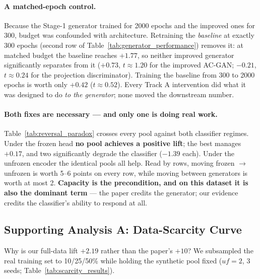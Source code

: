 \documentclass[11pt]{article}
\begin{document}
\paragraph{A matched-epoch control.} Because the Stage-1 generator trained for 2000 epochs and the improved ones for 300, budget was confounded with architecture. Retraining the \emph{baseline} at exactly 300 epochs (second row of Table~\ref{tab:generator_performance}) removes it: at matched budget the baseline reaches $+1.77$, so neither improved generator significantly separates from it ($+0.73$, $t \approx 1.20$ for the improved AC-GAN; $-0.21$, $t \approx 0.24$ for the projection discriminator). Training the baseline from 300 to 2000 epochs is worth only $+0.42$ ($t \approx 0.52$). Every Track A intervention did what it was designed to do \emph{to the generator}; none moved the downstream number.

\paragraph{Both fixes are necessary --- and only one is doing real work.} Table~\ref{tab:reversal_paradox} crosses every pool against both classifier regimes. Under the frozen head \textbf{no pool achieves a positive lift}; the best manages $+0.17$, and two significantly degrade the classifier ($-1.39$ each). Under the unfrozen encoder the identical pools all help. Read by rows, moving frozen $\to$ unfrozen is worth 5--6 points on every row, while moving between generators is worth at most 2. \textbf{Capacity is the precondition, and on this dataset it is also the dominant term} --- the paper credits the generator; our evidence credits the classifier's ability to respond at all.


\subsection{Supporting Analysis A: Data-Scarcity Curve}
Why is our full-data lift $+2.19$ rather than the paper's $+10$? We subsampled the real training set to 10/25/50\% while holding the synthetic pool fixed ($uf{=}2$, 3 seeds; Table~\ref{tab:scarcity_results}).
\end{document}
